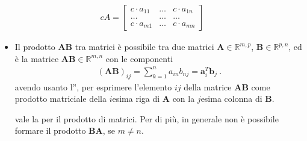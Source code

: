 \documentclass[letterpaper,10pt,italian]{jupyterBook}
\begin{document}
\begin{equation*}
\begin{split} c A = \begin{bmatrix}
   c \cdot a_{11} & \dots & c \cdot a_{1n} \\
   \dots          & \dots & \dots          \\
   c \cdot a_{m1} & \dots & c \cdot a_{mn}
   \end{bmatrix} \end{split}
\end{equation*}\begin{itemize}
\item {} 
\sphinxAtStartPar
{} Il prodotto \(\mathbf{A} \mathbf{B}\) tra matrici è possibile tra due matrici \(\mathbf{A} \in \mathbb{R}^{m,p}\), \(\mathbf{B} \in \mathbb{R}^{p,n}\), ed è la matrice \(\mathbf{A} \mathbf{B} \in \mathbb{R}^{m,n}\) con le componenti
\begin{equation*}
\begin{split}(\mathbf{A}\mathbf{B})_{ij} = \sum_{k=1}^{n} a_{in} b_{nj} = \mathbf{a}_i^T \mathbf{b}_j \ .\end{split}
\end{equation*}
\sphinxAtStartPar
avendo usanto l”{\hyperref[\detokenize{ch/algebra/linear-algebra:math-hs-algebra-linear-matrices-content}]{}}, per esprimere l’elemento \(ij\) della matrice \(\mathbf{A} \mathbf{B}\) come prodotto matriciale della \(i\)\sphinxhyphen{}esima riga di \(\mathbf{A}\) con la \(j\)\sphinxhyphen{}esima colonna di \(\mathbf{B}\).

\sphinxAtStartPar
{}  vale la  per il prodotto di matrici. Per di più, in generale non è possibile formare il prodotto \(\mathbf{B} \mathbf{A}\), se \(m \ne n\).

\end{itemize}
\label{ch/algebra/linear-algebra:matrix-prod-noncomm}
\end{document}
